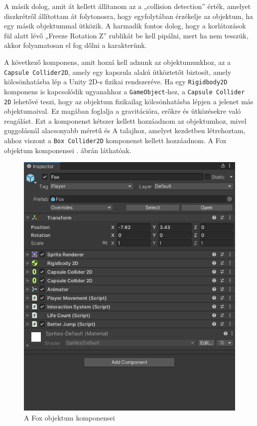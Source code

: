 A másik dolog, amit át kellett állítanom az a „collision detection” érték, amelyet diszkrétről állítottam át folytonosra, hogy egyfolytában érzékelje az objektum, ha egy másik objektummal ütközik. A harmadik fontos dolog, hogy a korlátozások fül alatt lévő „Freeze Rotation Z” rublikát be kell pipálni, mert ha nem tesszük, akkor folyamatosan el fog dőlni a karakterünk.

 A következő komponens, amit hozzá kell adnunk az objektumunkhoz, az a \texttt{Capsule Collider2D}, amely egy kapszula alakú ütköztetőt biztosít, amely kölcsönhatásba lép a Unity 2D-s fizikai rendszeréve. Ha egy \texttt{Rigidbody2D} komponens is kapcsolódik ugyanahhoz a \texttt{GameObject}-hez, a \texttt{Capsule Collider 2D} lehetővé teszi, hogy az objektum fizikailag kölcsönhatásba lépjen a jelenet más objektumaival. Ez magában foglalja a gravitációra, erőkre és ütközésekre való reagálást. Ezt a komponenst kétszer kellett hozzáadnom az objektumhoz, mivel guggolásnál alacsonyabb méretű és  A talajhoz, amelyet kezdetben létrehoztam, ahhoz viszont a \texttt{Box Collider2D} komponenst kellett hozzáadnom.\cite{unityrigidbody2d} A Fox objektum komponensei . ábrán láthatóak.

\begin{figure}[ht]
\centering
\includegraphics[scale = 0.7]{images/foxcomponents.png}
\caption{A Fox objektum komponensei}
\label{fig:foxcomponents}
\end{figure}

